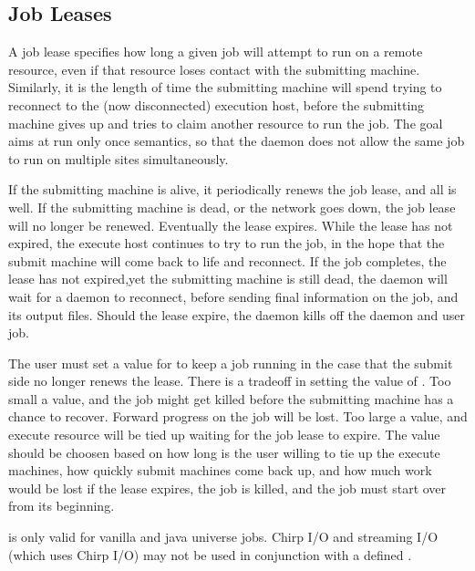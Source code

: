 \subsection{\label{sec:Job-Lease}
Job Leases}

A job lease specifies how long a given job will attempt to run
on a remote resource,
even if that resource loses contact with the submitting machine.
Similarly, it is the length of time the submitting machine will
spend trying to reconnect to the (now disconnected) execution host,
before the submitting machine gives up and tries to claim
another resource to run the job.
The goal aims at run only once semantics,
so that the  daemon does not allow the same job
to run on multiple sites simultaneously.

If the submitting machine is alive,
it periodically renews the job lease,
and all is well.
If the submitting machine is dead,
or the network goes down, the job lease will no longer be renewed.
Eventually the lease expires.
While the lease has not expired,
the execute host continues to try to run the job,
in the hope that the submit machine will come back to life
and reconnect.
If the job completes, the lease has not expired,yet the 
submitting machine is still dead,
the  daemon will wait for a
 daemon to reconnect, 
before sending final information on the job,
and its output files.
Should the lease expire, the  daemon
kills off the  daemon and user job.

The user must set a value for 
to keep a job running in the case that the submit side no longer
renews the lease.
There is a tradeoff in setting the value of . 
Too small a value,
and the job might get killed before the submitting machine has a
chance to recover.
Forward progress on the job will be lost.
Too large a value,
and execute resource will be tied up waiting for the job lease to expire.
The value 
should be choosen based on how long is the user willing to tie up
the execute machines, how quickly submit machines come  back up,
and how much work would be lost if the lease expires,
the job is killed, and the job must start over from its beginning.

is only valid for vanilla and java universe jobs.
Chirp I/O and streaming I/O (which uses Chirp I/O) may not
be used in conjunction with a defined .

